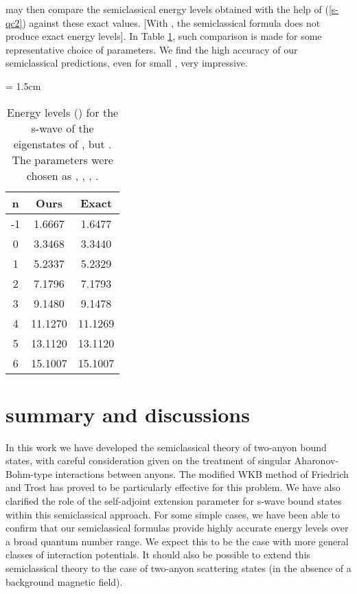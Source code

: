 \documentclass[a4paper,aps,eqsecnum,preprint,preprintnumbers,12pt]{revtex4}
\begin{document}
may then compare the semiclassical energy levels obtained with the
help of (\ref{s-qc2}) against these exact values. [With \coordHE{}, the semiclassical formula does not produce exact energy
levels]. In Table \ref{tab2}, such comparison is made for some
representative choice of parameters. We find the high accuracy of
our semiclassical predictions, even for small \coordHE{}, very
impressive.
\begin{table}[t]
\caption{Energy levels (\coordHE{}) for the s-wave of the eigenstates
of \coordHE{}, but \coordHE{}. The parameters were chosen as \coordHE{}, \coordHE{}, \coordHE{}, \coordHE{}. \label{tab2}}
\begin{center}
\tabcolsep = 1.5cm
\begin{tabular}{c|cc}
\hline \hline n & Ours & Exact \\ \hline
-1 & 1.6667 & 1.6477 \\
0 & 3.3468 & 3.3440 \\
1 & 5.2337 & 5.2329 \\
2 & 7.1796 & 7.1793 \\
3 & 9.1480 & 9.1478 \\
4 & 11.1270 & 11.1269 \\
5 & 13.1120 & 13.1120 \\
6 & 15.1007 & 15.1007 \\
\hline \hline
\end{tabular}
\end{center}
\end{table}

\section{summary and discussions}

In this work we have developed the semiclassical theory of
two-anyon bound states, with careful consideration given on the
treatment of singular Aharonov-Bohm-type interactions between
anyons. The modified WKB method of Friedrich and Trost has proved
to be particularly effective for this problem. We have also
clarified the role of the self-adjoint extension parameter for
s-wave bound states within this semiclassical approach. For some
simple cases, we have been able to confirm that our semiclassical
formulas provide highly accurate energy levels over a broad
quantum number range. We expect this to be the case with more
general classes of interaction potentials. It should also be
possible to extend this semiclassical theory to the case of
two-anyon scattering states (in the absence of a background
magnetic field).
\end{document}
